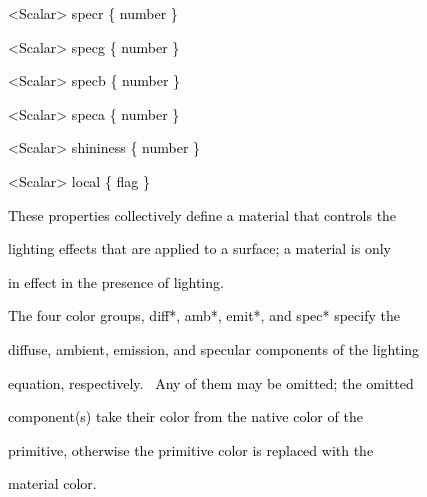 \documentclass[a4paper]{article}
\newcommand\textstyleOOoComputerKeyWord[1]{\textrm{\textcolor[rgb]{0.0,0.0,0.5019608}{#1}}}
\begin{document}
\bigskip

{\color{black}
\textstyleOOoComputerKeyWord{\textcolor{black}{\ \ {\textless}Scalar{\textgreater} specr \{ number \}}}}

{\color{black}
\textstyleOOoComputerKeyWord{\textcolor{black}{\ \ {\textless}Scalar{\textgreater} specg \{ number \}}}}

{\color{black}
\textstyleOOoComputerKeyWord{\textcolor{black}{\ \ {\textless}Scalar{\textgreater} specb \{ number \}}}}

{\color{black}
\textstyleOOoComputerKeyWord{\textcolor{black}{\ \ {\textless}Scalar{\textgreater} speca \{ number \}}}}


\bigskip

{\color{black}
\textstyleOOoComputerKeyWord{\textcolor{black}{\ \ {\textless}Scalar{\textgreater} shininess \{ number \}}}}

{\color{black}
\textstyleOOoComputerKeyWord{\textcolor{black}{\ \ {\textless}Scalar{\textgreater} local \{ flag \}}}}


\bigskip

{\color{black}
\textstyleOOoComputerKeyWord{\textcolor{black}{\ \ These properties collectively define a
{\textquotedbl}material{\textquotedbl} that controls the}}}

{\color{black}
\textstyleOOoComputerKeyWord{\textcolor{black}{\ \ lighting effects that are applied to a surface; a material is only}}}

{\color{black}
\textstyleOOoComputerKeyWord{\textcolor{black}{\ \ in effect in the presence of lighting.}}}


\bigskip

{\color{black}
\textstyleOOoComputerKeyWord{\textcolor{black}{\ \ The four color groups, diff*, amb*, emit*, and spec* specify the}}}

{\color{black}
\textstyleOOoComputerKeyWord{\textcolor{black}{\ \ diffuse, ambient, emission, and specular components of the
lighting}}}

{\color{black}
\textstyleOOoComputerKeyWord{\textcolor{black}{\ \ equation, respectively. \ Any of them may be omitted; the omitted}}}

{\color{black}
\textstyleOOoComputerKeyWord{\textcolor{black}{\ \ component(s) take their color from the native color of the}}}

{\color{black}
\textstyleOOoComputerKeyWord{\textcolor{black}{\ \ primitive, otherwise the primitive color is replaced with the}}}

{\color{black}
\textstyleOOoComputerKeyWord{\textcolor{black}{\ \ material color.}}}
\end{document}
